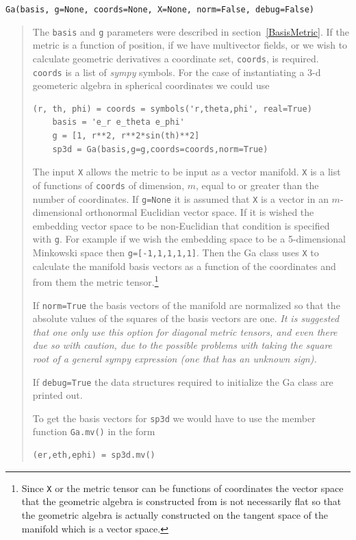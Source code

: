 \documentclass[12pt]{report}
\newcommand{\T}[1]{\texttt{#1}}
\begin{document}
\T{Ga(basis, g=None, coords=None, X=None, norm=False, debug=False)}
\begin{quote}
   The \T{basis} and \T{g} parameters were described in section~\ref{BasisMetric}.
   If the metric is a function of position, if we have multivector fields, or we 
   wish to calculate geometric derivatives a coordinate set, \T{coords}, is required. 
   \T{coords} is a list of \emph{sympy} symbols.  For the case of instantiating a 3-d geometeric
   algebra in spherical coordinates we could use
   \begin{lstlisting}[numbers=none]
   	(r, th, phi) = coords = symbols('r,theta,phi', real=True)
   	basis = 'e_r e_theta e_phi'
   	g = [1, r**2, r**2*sin(th)**2]
   	sp3d = Ga(basis,g=g,coords=coords,norm=True)
   \end{lstlisting}
   The input \T{X} allows the metric to be input as a vector manifold.
   \T{X} is a list of functions of \T{coords} of dimension, $m$, equal to or greater
   than the number of coordinates.  If \T{g=None} it is assumed that \T{X} is a 
   vector in an $m$-dimensional orthonormal Euclidian vector space. If it is wished
   the embedding vector space to be non-Euclidian that condition is specified with
   \T{g}.  For example if we wish the embedding space to be a 5-dimensional Minkowski
   space then \T{g=[-1,1,1,1,1]}.  Then the Ga class uses \T{X} to calculate the
   manifold basis vectors as a function of the coordinates and from them the metric
   tensor.\footnote{Since \T{X} or the metric tensor can be functions of coordinates
   the vector space that the geometric algebra is constructed from is not necessarily 
   flat so that the geometric algebra is actually constructed on the tangent space of
   the manifold which is a vector space.}

   If \T{norm=True} the basis vectors of the manifold are normalized so that the 
   absolute values of the squares of the basis vectors are one. \emph{It is suggested
   that one only use this option for diagonal metric tensors, and even there due so
   with caution, due to the possible 
   problems with taking the square root of a general \emph{sympy} expression (one that has an
   unknown sign).}
     
   If \T{debug=True} the data structures required to initialize the Ga class
   are printed out.
   
   To get the basis vectors for \T{sp3d} we would have to use the member function 
   \T{Ga.mv()} in the form
   \begin{lstlisting}[numbers=none]
	(er,eth,ephi) = sp3d.mv()
   \end{lstlisting}   
\end{quote}
\end{document}
